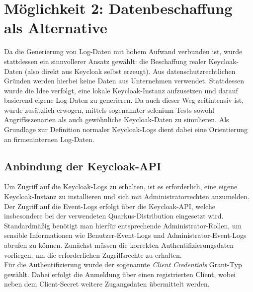 \documentclass[a4paper,12pt]{article}
\begin{document}
	\section{Möglichkeit 2: Datenbeschaffung als Alternative}
	Da die Generierung von Log-Daten mit hohem Aufwand verbunden ist, wurde stattdessen ein sinnvollerer Ansatz gewählt: die Beschaffung realer Keycloak-Daten (also direkt aus Keycloak selbst erzeugt). Aus datenschutzrechtlichen Gründen werden hierbei keine Daten aus Unternehmen verwendet. Stattdessen wurde die Idee verfolgt, eine lokale Keycloak-Instanz aufzusetzen und darauf basierend eigene Log-Daten zu generieren. Da auch dieser Weg zeitintensiv ist, wurde zusätzlich erwogen, mittels sogenannter \gls{selenium}-Tests sowohl Angriffsszenarien als auch gewöhnliche Keycloak-Daten zu simulieren. Als Grundlage zur Definition normaler Keycloak-Logs dient dabei eine Orientierung an firmeninternen Log-Daten.
	
	\subsection{Anbindung der Keycloak-API}
	Um Zugriff auf die Keycloak-Logs zu erhalten, ist es erforderlich, eine eigene Keycloak-Instanz zu installieren und sich mit Administratorrechten anzumelden. 
	\\[0.5em]
	Der Zugriff auf die Event-Logs erfolgt über die Keycloak-API, welche insbesondere bei der verwendeten Quarkus-Distribution eingesetzt wird. Standardmäßig benötigt man hierfür entsprechende Administrator-Rollen, um sensible Informationen wie Benutzer-Event-Logs und Administrator-Event-Logs abrufen zu können. Zunächst müssen die korrekten Authentifizierungsdaten vorliegen, um die erforderlichen Zugriffsrechte zu erhalten.
	\\[0.5em]
	Für die Authentifizierung wurde der sogenannte \textit{Client Credentials} Grant-Typ gewählt. Dabei erfolgt die Anmeldung über einen registrierten Client, wobei neben dem Client-Secret weitere Zugangsdaten übermittelt werden.
\end{document}
